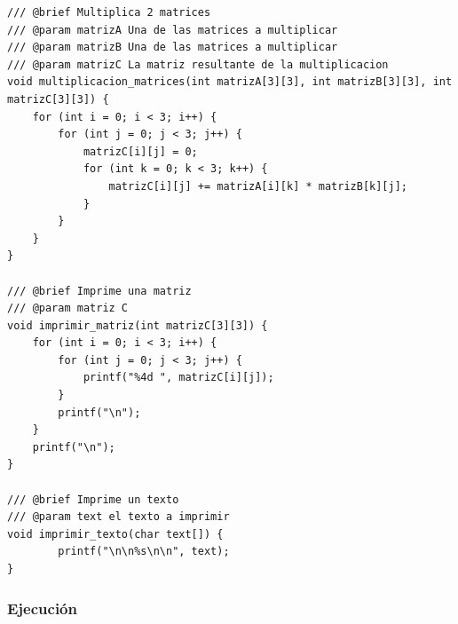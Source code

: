 \documentclass{article}
\begin{document}
\begin{lstlisting}
/// @brief Multiplica 2 matrices
/// @param matrizA Una de las matrices a multiplicar
/// @param matrizB Una de las matrices a multiplicar
/// @param matrizC La matriz resultante de la multiplicacion
void multiplicacion_matrices(int matrizA[3][3], int matrizB[3][3], int matrizC[3][3]) {
	for (int i = 0; i < 3; i++) {
		for (int j = 0; j < 3; j++) {
			matrizC[i][j] = 0;
			for (int k = 0; k < 3; k++) {
				matrizC[i][j] += matrizA[i][k] * matrizB[k][j];
			}
		}
	}
}

/// @brief Imprime una matriz
/// @param matriz C 
void imprimir_matriz(int matrizC[3][3]) {
	for (int i = 0; i < 3; i++) {
		for (int j = 0; j < 3; j++) {
			printf("%4d ", matrizC[i][j]);
		}
		printf("\n");
	}
	printf("\n");
}

/// @brief Imprime un texto
/// @param text el texto a imprimir
void imprimir_texto(char text[]) {
		printf("\n\n%s\n\n", text);
}
\end{lstlisting}

\subsubsection{Ejecución}
\end{document}
